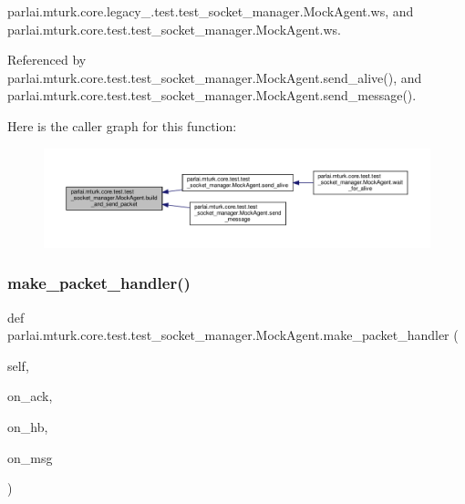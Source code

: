 parlai.\+mturk.\+core.\+legacy\+\_.\+test.\+test\+\_\+socket\+\_\+manager.\+Mock\+Agent.\+ws, and parlai.\+mturk.\+core.\+test.\+test\+\_\+socket\+\_\+manager.\+Mock\+Agent.\+ws.



Referenced by parlai.\+mturk.\+core.\+test.\+test\+\_\+socket\+\_\+manager.\+Mock\+Agent.\+send\+\_\+alive(), and parlai.\+mturk.\+core.\+test.\+test\+\_\+socket\+\_\+manager.\+Mock\+Agent.\+send\+\_\+message().

Here is the caller graph for this function\+:
\nopagebreak
\begin{figure}[H]
\begin{center}
\leavevmode
\includegraphics[width=350pt]{classparlai_1_1mturk_1_1core_1_1test_1_1test__socket__manager_1_1MockAgent_a0ed4ae8ea1b3bc86f3397bd4dadf2d40_icgraph}
\end{center}
\end{figure}
\mbox{\label{classparlai_1_1mturk_1_1core_1_1test_1_1test__socket__manager_1_1MockAgent_a06d5e6cb09b2472a0b1972a7bb82ef31}} 
\subsubsection{\texorpdfstring{make\+\_\+packet\+\_\+handler()}{make\_packet\_handler()}}
{\footnotesize\ttfamily def parlai.\+mturk.\+core.\+test.\+test\+\_\+socket\+\_\+manager.\+Mock\+Agent.\+make\+\_\+packet\+\_\+handler (\begin{DoxyParamCaption}\item[{}]{self,  }\item[{}]{on\+\_\+ack,  }\item[{}]{on\+\_\+hb,  }\item[{}]{on\+\_\+msg }\end{DoxyParamCaption})}

